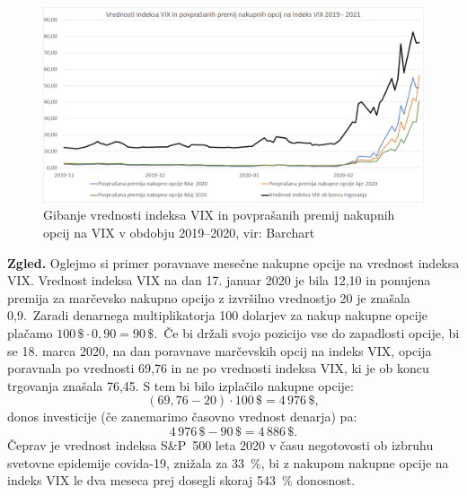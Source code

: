\documentclass[12pt,a4paper, reqno]{amsart}
\theoremstyle{definition} %
\theoremstyle{plain} %
\newcommand{\geslo}[2]{\noindent\textbf{#1}\hspace*{3mm}\hangindent=\parindent\hangafter=1 #2}
\begin{document}
\begin{figure}[!h]
\centering
\includegraphics[width = 15 cm]{Grafi/VIX_call_options_20.png}
\caption{Gibanje vrednosti indeksa VIX in povprašanih premij nakupnih opcij na VIX v obdobju 2019--2020, vir: Barchart}
\label{Graf 10}
\end{figure}

\textbf{Zgled.}
Oglejmo si primer poravnave mesečne nakupne opcije na vrednost indeksa VIX.  Vrednost indeksa VIX na dan 17. januar 2020 je bila 12,10 in ponujena premija za marčevsko nakupno opcijo z izvršilno vrednostjo 20 je znašala 0,9.\
Zaradi denarnega multiplikatorja 100 dolarjev za nakup nakupne opcije plačamo $100\,\$ \cdot 0,\!90 = 90\,\$$.\
Če bi držali svojo pozicijo vse do zapadlosti opcije, bi se 18. marca 2020, na dan poravnave marčevskih opcij na indeks VIX, opcija poravnala po vrednosti 69,76 in ne po vrednosti indeksa VIX, ki je ob koncu trgovanja znašala 76,45. S tem bi bilo izplačilo nakupne opcije:
$$
(69,\!76 - 20) \cdot 100\,\$ = 4\,976\,\$,
$$
donos investicije (če zanemarimo časovno vrednost denarja) pa:
$$
4\,976\,\$ -90\,\$ = 4\,886\,\$.
$$
Čeprav je vrednost indeksa S\&P~500 leta 2020 v času negotovosti ob izbruhu svetovne epidemije covida-19, znižala za 33~\%, bi z nakupom nakupne opcije na indeks VIX le dva meseca prej dosegli skoraj 543~\% donosnost.





%
%
\end{document}
